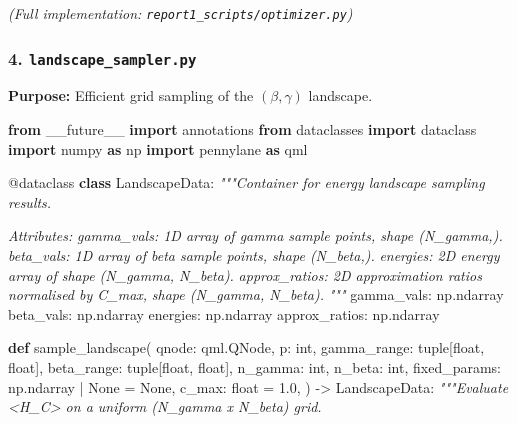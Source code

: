 \documentclass[
  11pt,
]{report}
\newenvironment{Shaded}{}{}
\newcommand{\AttributeTok}[1]{\textcolor[rgb]{0.49,0.56,0.16}{#1}}
\newcommand{\BuiltInTok}[1]{\textcolor[rgb]{0.00,0.50,0.00}{#1}}
\newcommand{\CommentTok}[1]{\textcolor[rgb]{0.38,0.63,0.69}{\textit{#1}}}
\newcommand{\FloatTok}[1]{\textcolor[rgb]{0.25,0.63,0.44}{#1}}
\newcommand{\ImportTok}[1]{\textcolor[rgb]{0.00,0.50,0.00}{\textbf{#1}}}
\newcommand{\KeywordTok}[1]{\textcolor[rgb]{0.00,0.44,0.13}{\textbf{#1}}}
\newcommand{\NormalTok}[1]{#1}
\newcommand{\OperatorTok}[1]{\textcolor[rgb]{0.40,0.40,0.40}{#1}}
\newcommand{\VariableTok}[1]{\textcolor[rgb]{0.10,0.09,0.49}{#1}}
\begin{document}
\emph{(Full implementation: \texttt{report1\_scripts/optimizer.py})}

\subsubsection{\texorpdfstring{4.
\texttt{landscape\_sampler.py}}{4. landscape\_sampler.py}}\label{landscape_sampler.py}

\textbf{Purpose:} Efficient grid sampling of the \((\beta, \gamma)\)
landscape.

\begin{Shaded}
\begin{Highlighting}[]
\ImportTok{from}\NormalTok{ \_\_future\_\_ }\ImportTok{import}\NormalTok{ annotations}
\ImportTok{from}\NormalTok{ dataclasses }\ImportTok{import}\NormalTok{ dataclass}
\ImportTok{import}\NormalTok{ numpy }\ImportTok{as}\NormalTok{ np}
\ImportTok{import}\NormalTok{ pennylane }\ImportTok{as}\NormalTok{ qml}


\AttributeTok{@dataclass}
\KeywordTok{class}\NormalTok{ LandscapeData:}
    \CommentTok{"""Container for energy landscape sampling results.}

\CommentTok{    Attributes:}
\CommentTok{        gamma\_vals: 1D array of gamma sample points, shape (N\_gamma,).}
\CommentTok{        beta\_vals: 1D array of beta sample points, shape (N\_beta,).}
\CommentTok{        energies: 2D energy array of shape (N\_gamma, N\_beta).}
\CommentTok{        approx\_ratios: 2D approximation ratios normalised by C\_max,}
\CommentTok{                        shape (N\_gamma, N\_beta).}
\CommentTok{    """}
\NormalTok{    gamma\_vals: np.ndarray}
\NormalTok{    beta\_vals: np.ndarray}
\NormalTok{    energies: np.ndarray}
\NormalTok{    approx\_ratios: np.ndarray}


\KeywordTok{def}\NormalTok{ sample\_landscape(}
\NormalTok{    qnode: qml.QNode,}
\NormalTok{    p: }\BuiltInTok{int}\NormalTok{,}
\NormalTok{    gamma\_range: }\BuiltInTok{tuple}\NormalTok{[}\BuiltInTok{float}\NormalTok{, }\BuiltInTok{float}\NormalTok{],}
\NormalTok{    beta\_range: }\BuiltInTok{tuple}\NormalTok{[}\BuiltInTok{float}\NormalTok{, }\BuiltInTok{float}\NormalTok{],}
\NormalTok{    n\_gamma: }\BuiltInTok{int}\NormalTok{,}
\NormalTok{    n\_beta: }\BuiltInTok{int}\NormalTok{,}
\NormalTok{    fixed\_params: np.ndarray }\OperatorTok{|} \VariableTok{None} \OperatorTok{=} \VariableTok{None}\NormalTok{,}
\NormalTok{    c\_max: }\BuiltInTok{float} \OperatorTok{=} \FloatTok{1.0}\NormalTok{,}
\NormalTok{) }\OperatorTok{{-}\textgreater{}}\NormalTok{ LandscapeData:}
    \CommentTok{"""Evaluate \textless{}H\_C\textgreater{} on a uniform (N\_gamma x N\_beta) grid.}


\end{Highlighting}
\end{Shaded}
\end{document}
